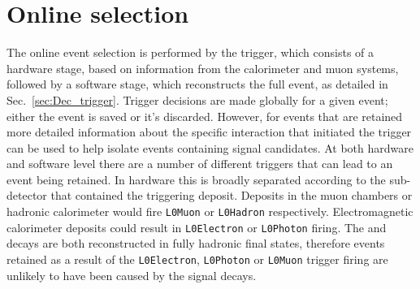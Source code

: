 \section{Online selection}
\label{sec:selection_trigger}
The online event selection is performed by the \lhcb trigger, which consists of a hardware stage, based on information from the calorimeter and muon systems, followed by a software stage, which reconstructs the full event, as detailed in Sec.~\ref{sec:Dec_trigger}.
Trigger decisions are made globally for a given event; either the event is saved or it's discarded. However, for events that are retained more detailed information about the specific interaction that initiated the trigger can be used to help isolate events containing signal candidates. At both hardware and software level there are a number of different triggers that can lead to an event being retained. In hardware this is broadly separated according to the sub-detector that contained the triggering deposit. Deposits in the muon chambers or hadronic calorimeter would fire \texttt{L0Muon} or \texttt{L0Hadron} respectively. Electromagnetic calorimeter deposits could result in \texttt{L0Electron} or \texttt{L0Photon} firing. The \decay{\Bp}{\Dsp\Kp\Km} and \decay{\Bp}{\Dsp}{\phiz} decays are both reconstructed in fully hadronic final states, therefore events retained as a result of the \texttt{L0Electron}, \texttt{L0Photon} or \texttt{L0Muon} trigger firing are unlikely to have been caused by the signal decays. 

